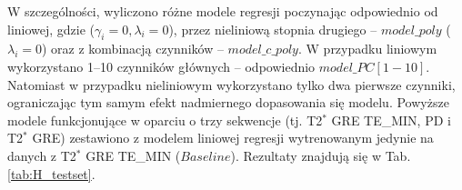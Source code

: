 W szczególności, wyliczono różne modele regresji poczynając odpowiednio od liniowej, gdzie ($\gamma_{i}=0, \lambda_{i}=0$), przez nieliniową stopnia drugiego -- $model\_poly$ ($\lambda_{i}=0$) oraz z kombinacją czynników -- $model\_c\_poly$. W przypadku liniowym wykorzystano 1--10 czynników głównych -- odpowiednio $model\_PC[1-10]$. Natomiast w przypadku nieliniowym wykorzystano tylko dwa pierwsze czynniki, ograniczając tym samym efekt nadmiernego dopasowania się modelu. Powyższe modele funkcjonujące w oparciu o trzy sekwencje (tj. T2$^\ast$ GRE TE\_MIN, PD i T2$^\ast$ GRE) zestawiono z modelem liniowej regresji wytrenowanym jedynie na danych z T2$^\ast$ GRE TE\_MIN ($Baseline$). Rezultaty znajdują się w Tab. \ref{tab:H_testset}.
\renewcommand{\arraystretch}{1.2}
\vspace{10px}
